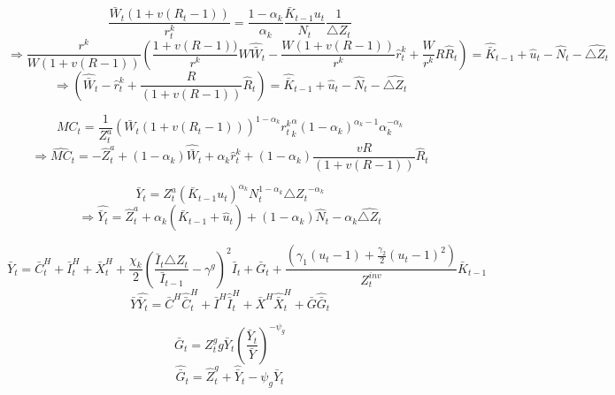 \documentclass[11pt, a4paper]{article}
\begin{document}
\begin{itemize}
\[\frac{\bar{W}_t (1+v(R_t -1))}{r_t^k} = \frac{1-\alpha_k}{\alpha_k} \frac{\bar{K}_{t-1} u_t}{N_t } \frac{1}{{\bigtriangleup Z_t}}\]
\begin{equation*}
\Rightarrow \frac{r^k}{W(1+v(R-1))}\left(\frac{1+v(R-1))}{r^k}W\widehat{\bar{W}}_t -\frac{W(1+v(R-1))}{r^k}\widehat{r}_t^k + \frac{W}{r^k}R\widehat{R}_t\right) = \widehat{\bar{K}}_{t-1} + \widehat{u}_t - \widehat{N}_t - \widehat{\bigtriangleup Z_t}
\end{equation*}
\begin{equation}
\Rightarrow \left(\widehat{\bar{W}}_t -\widehat{r}_t^k + \frac{R}{(1+v(R-1))}\widehat{R}_t\right) = \widehat{\bar{K}}_{t-1} + \widehat{u}_t - \widehat{N}_t - \widehat{\bigtriangleup Z_t}
\end{equation}

\[ MC_t = \frac{1}{Z_t^a}\left(\bar{W}_t(1+v(R_t-1))  \right)^{1-\alpha_k} {r_t^k}^\alpha_k(1-\alpha_k)^{\alpha_k -1}\alpha_k ^{-\alpha_k}\]
\begin{equation}
\Rightarrow \widehat{MC}_t = -\widehat{Z}_t^a + (1-\alpha_k) \widehat{\bar{W}}_t + \alpha_k \widehat{r}_t^k + (1-\alpha_k)\frac{vR}{(1+v(R-1))}\widehat{R}_t
\end{equation}

\[\bar{Y}_t = Z_t^a (\bar{K}_{t-1}u_t)^{\alpha_k}N_t^{1-\alpha_k} {\bigtriangleup Z_t}^{-\alpha_k}\]
\begin{equation}
\Rightarrow \widehat{\bar{Y}_t} = \widehat{Z}_t^a + \alpha_k ( \widehat{\bar{K}}_{t-1} + \widehat{u}_t ) + (1-\alpha_k) \widehat{N}_t -\alpha_k \widehat{\bigtriangleup Z_t}
\end{equation}

\[\bar{Y}_t = \bar{C}_t^H + \bar{I}_t^H + \bar{X}_t^H + \frac{\chi_k}{2}\left( \frac{\bar{I}_t {\bigtriangleup Z_t}}{\bar{I}_{t-1}} -\gamma^g \right)^2\bar{I}_t+ \bar{G}_t + \frac{\left(\gamma_1(u_t -1) + \frac{\gamma_2}{2}(u_t -1)^2\right)}{Z_t^{inv}} \bar{K}_{t-1}\]
\begin{equation}
\bar{Y}\widehat{\bar{Y}_t} = \bar{C}^H \widehat{\bar{C}}_t^H + \bar{I}^H \widehat{\bar{I}}_t^H + \bar{X}^H \widehat{\bar{X}}_t^H + \bar{G}\widehat{\bar{G}}_t
\end{equation}

\[\bar{G}_t = Z_t^g g\bar{Y}_t\left( \frac{\bar{Y}_t}{\bar{Y}} \right)^{-\psi_g}\]
\begin{equation}
\widehat{\bar{G}}_t = \widehat{Z}_t ^g + \widehat{\bar{Y}}_t - \psi_g \widehat{\bar{Y}}_t
\end{equation}


\end{itemize}
\end{document}
